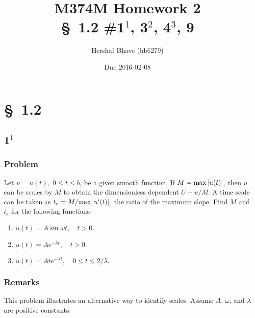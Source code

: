 \documentclass[12pt]{article}
\title{M374M Homework 2 \\
  \normalsize{\S~1.2 \#1$^1$, 3$^2$, 4$^3$, 9}}
\author{Hershal Bhave (hb6279)}
\date{Due 2016-02-08}
\begin{document}
\maketitle

\section{\S~1.2}
\subsection{1$^1$}

\subsubsection*{Problem}
Let $u=u(t),\;0 \le t \le b$, be a given smooth function. If
$M=\text{max}\left|{u(t)}\right|$, then $u$ can be scales by $M$ to obtain the
dimensionless dependent $U-u/M$. A time scale can be taken as
$t_c=M/\text{max}\left|{u'(t)}\right|$, the ratio of the maximum slope. Find $M$ and
$t_c$ for the following functions:
\begin{enumerate}
\item $u(t)=A\sin\omega t, \quad t>0$.
\item $u(t)=Ae^{-\lambda t},\quad t>0$.
\item $u(t)=Ate^{-\lambda t},\quad 0 \le t \le 2/\lambda.$
\end{enumerate}

\subsubsection*{Remarks}
This problem illustrates an alternative way to identify scales. Assume $A$,
$\omega$, and $\lambda$ are positive constants.
\end{document}
